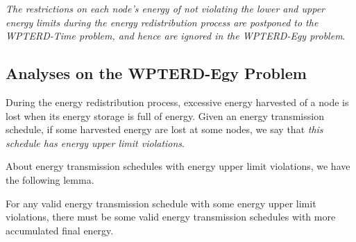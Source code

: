 \documentclass[journal,10pt]{IEEEtran}
\begin{document}
\textit{The restrictions on each node's energy of not violating the lower and upper energy limits during the energy redistribution process are postponed to the WPTERD-Time problem, and hence are ignored in the WPTERD-Egy problem}.

\subsection{Analyses on the WPTERD-Egy Problem}
During the energy redistribution process, excessive energy harvested of a node is lost when its energy storage is full of energy. Given an energy transmission schedule, if some harvested energy are lost at some nodes, we say that \textit{this schedule has energy upper limit violations}.

About energy transmission schedules with energy upper limit violations, we have the following lemma.
\begin{lemma}
\label{lemma_violation}
For any valid energy transmission schedule with some energy upper limit violations, there must be some valid energy transmission schedules with more accumulated final energy.
\end{lemma}
\end{document}
